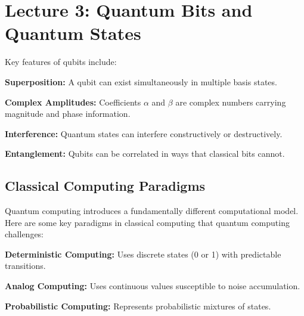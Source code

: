 \section{Lecture 3: Quantum Bits and Quantum States} \label{sec:lecture3}


\vspace{0.3cm}

\noindent

Key features of qubits include: 

\begin{itemize}
  \ii \textbf{Superposition:} A qubit can exist simultaneously in multiple
  basis states.

  \ii \textbf{Complex Amplitudes:} Coefficients $\alpha$ and $\beta$ are
  complex numbers carrying magnitude and phase information.

  \ii \textbf{Interference:} Quantum states can interfere constructively or
  destructively.

  \ii \textbf{Entanglement:} Qubits can be correlated in ways that
  classical bits cannot.

\end{itemize}

\subsection*{Classical Computing Paradigms} 

Quantum computing introduces a fundamentally different computational model.
Here are some key paradigms in classical computing that quantum computing
challenges:

\begin{itemize}
  \ii \textbf{Deterministic Computing:} Uses discrete states (0 or 1) with
  predictable transitions.

  \ii \textbf{Analog Computing:} Uses continuous values susceptible to
  noise accumulation.

  \ii \textbf{Probabilistic Computing:} Represents probabilistic mixtures
  of states.

\end{itemize}

